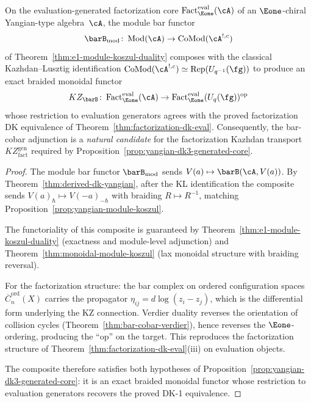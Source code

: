 \begin{proposition}
\label{prop:bar-cobar-kazhdan-candidate}
On the evaluation-generated factorization core
$\operatorname{Fact}_{\Eone}^{\mathrm{eval}}(\cA)$ of an $\Eone$-chiral Yangian-type algebra~$\cA$,
the module bar functor
\[
\barB_{\mathrm{mod}}\colon
\operatorname{Mod}(\cA)
\to
\operatorname{CoMod}(\cA^{!,c})
\]
of Theorem~\textup{\ref{thm:e1-module-koszul-duality}} composes with
the classical Kazhdan--Lusztig identification
$\operatorname{CoMod}(\cA^{!,c}) \simeq
\operatorname{Rep}(U_{q^{-1}}(\fg))$
to produce an exact braided monoidal functor
\begin{equation}\label{eq:bar-kazhdan}
KZ_{\barB}\colon
\operatorname{Fact}_{\Eone}^{\mathrm{eval}}(\cA) \to
\operatorname{Fact}_{\Eone}^{\mathrm{eval}}(U_q(\fg))^{\mathrm{op}}
\end{equation}
whose restriction to evaluation generators agrees with the proved
factorization DK equivalence of
Theorem~\textup{\ref{thm:factorization-dk-eval}}.
Consequently, the bar-cobar adjunction is a \emph{natural candidate}
for the factorization Kazhdan transport
$KZ_{\mathrm{fact}}^{\mathrm{gen}}$ required by
Proposition~\textup{\ref{prop:yangian-dk3-generated-core}}.
\end{proposition}

\begin{proof}
The module bar functor $\barB_{\mathrm{mod}}$ sends
$V(a) \mapsto \barB(\cA, V(a))$.
By Theorem~\ref{thm:derived-dk-yangian}, after the KL
identification the composite sends $V(a)_\hbar \mapsto
V(-a)_{-\hbar}$ with braiding $R \mapsto R^{-1}$, matching
Proposition~\ref{prop:yangian-module-koszul}.

The functoriality of this composite is guaranteed by
Theorem~\ref{thm:e1-module-koszul-duality} (exactness and
module-level adjunction) and
Theorem~\ref{thm:monoidal-module-koszul} (lax monoidal structure
with braiding reversal).

For the factorization structure: the bar complex on ordered
configuration spaces
$\overline{C}_n^{\mathrm{ord}}(X)$ carries the propagator
$\eta_{ij} = d\log(z_i - z_j)$, which is the differential form
underlying the KZ connection.  Verdier duality reverses the
orientation of collision cycles
(Theorem~\ref{thm:bar-cobar-verdier}), hence reverses the
$\Eone$-ordering, producing the ``op'' on the target.  This
reproduces the factorization structure of
Theorem~\ref{thm:factorization-dk-eval}(iii) on evaluation
objects.

The composite therefore satisfies both hypotheses of
Proposition~\ref{prop:yangian-dk3-generated-core}: it is an exact
braided monoidal functor whose restriction to evaluation generators
recovers the proved DK-1 equivalence.
\end{proof}

